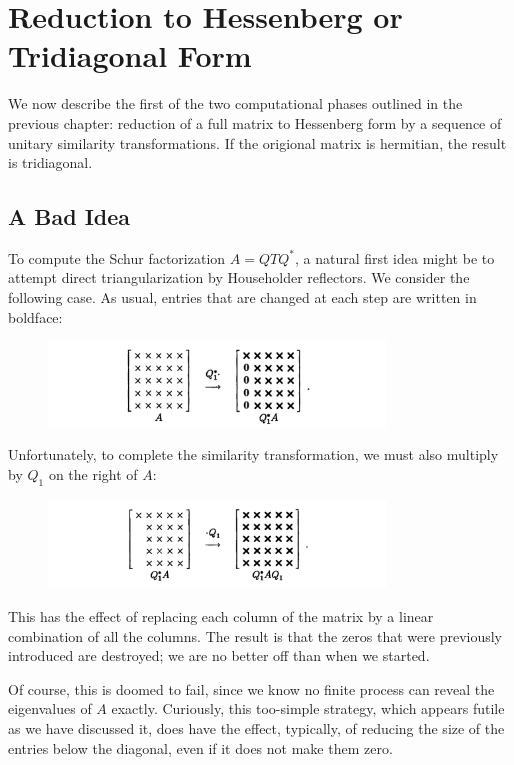 \chapter{Reduction to Hessenberg or Tridiagonal Form} 
We now describe the first of the two computational phases outlined in the previous chapter: reduction of a full matrix to Hessenberg form by a sequence of unitary similarity transformations. If the origional matrix is hermitian, the result is tridiagonal. 

\section{A Bad Idea}
To compute the Schur factorization $A = QT Q^* $, a natural first idea might be to attempt direct triangularization by Householder reflectors. We consider the following case. As usual, entries that are changed at each step are written in boldface:
\begin{figure}[H]
    \centering
    \includegraphics[width=0.8\textwidth]{figures/26-1.png}
\end{figure}
Unfortunately, to complete the similarity transformation, we must also multiply by $Q_1$ on the right of $A$: 
\begin{figure}[H]
    \centering
    \includegraphics[width=0.8\textwidth]{figures/26-2.png}
\end{figure}
This has the effect of replacing each column of the matrix by a linear combination  of all the columns. The result is that the zeros that were previously introduced are destroyed; we are no better off than when we started.  

Of course, this is doomed to fail, since we know no finite process can reveal the eigenvalues of $A$ exactly. Curiously, this too-simple strategy, which appears futile as we have discussed it, does have the effect, typically, of reducing the size of the entries below the diagonal, even if it does not make them zero.  

